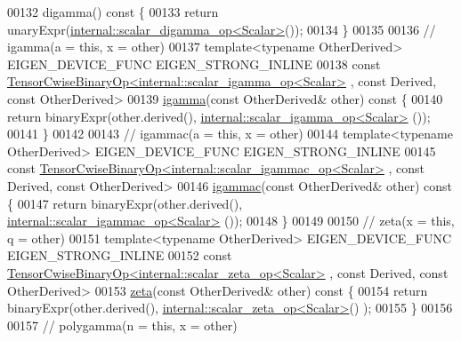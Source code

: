 \begin{DoxyCode}
00132     digamma()\textcolor{keyword}{ const }\{
00133       \textcolor{keywordflow}{return} unaryExpr(\hyperlink{struct_eigen_1_1internal_1_1scalar__digamma__op}{internal::scalar\_digamma\_op<Scalar>}());
00134     \}
00135 
00136     \textcolor{comment}{// igamma(a = this, x = other)}
00137     \textcolor{keyword}{template}<\textcolor{keyword}{typename} OtherDerived> EIGEN\_DEVICE\_FUNC EIGEN\_STRONG\_INLINE
00138     \textcolor{keyword}{const} \hyperlink{class_eigen_1_1_tensor_cwise_binary_op}{TensorCwiseBinaryOp<internal::scalar\_igamma\_op<Scalar>}
      , \textcolor{keyword}{const} Derived, \textcolor{keyword}{const} OtherDerived>
00139     \hyperlink{namespace_eigen_af5aa651137636b1cdbd27de1cfe91148}{igamma}(\textcolor{keyword}{const} OtherDerived& other)\textcolor{keyword}{ const }\{
00140       \textcolor{keywordflow}{return} binaryExpr(other.derived(), \hyperlink{struct_eigen_1_1internal_1_1scalar__igamma__op}{internal::scalar\_igamma\_op<Scalar>}
      ());
00141     \}
00142 
00143     \textcolor{comment}{// igammac(a = this, x = other)}
00144     \textcolor{keyword}{template}<\textcolor{keyword}{typename} OtherDerived> EIGEN\_DEVICE\_FUNC EIGEN\_STRONG\_INLINE
00145     \textcolor{keyword}{const} \hyperlink{class_eigen_1_1_tensor_cwise_binary_op}{TensorCwiseBinaryOp<internal::scalar\_igammac\_op<Scalar>}
      , \textcolor{keyword}{const} Derived, \textcolor{keyword}{const} OtherDerived>
00146     \hyperlink{namespace_eigen_a1abaa2ff8c7b1871eaf026a47c6bbf3b}{igammac}(\textcolor{keyword}{const} OtherDerived& other)\textcolor{keyword}{ const }\{
00147       \textcolor{keywordflow}{return} binaryExpr(other.derived(), \hyperlink{struct_eigen_1_1internal_1_1scalar__igammac__op}{internal::scalar\_igammac\_op<Scalar>}
      ());
00148     \}
00149 
00150     \textcolor{comment}{// zeta(x = this, q = other)}
00151     \textcolor{keyword}{template}<\textcolor{keyword}{typename} OtherDerived> EIGEN\_DEVICE\_FUNC EIGEN\_STRONG\_INLINE
00152     \textcolor{keyword}{const} \hyperlink{class_eigen_1_1_tensor_cwise_binary_op}{TensorCwiseBinaryOp<internal::scalar\_zeta\_op<Scalar>}
      , \textcolor{keyword}{const} Derived, \textcolor{keyword}{const} OtherDerived>
00153     \hyperlink{namespace_eigen_af9555e27540da78d2c4bdd17d3b750b1}{zeta}(\textcolor{keyword}{const} OtherDerived& other)\textcolor{keyword}{ const }\{
00154       \textcolor{keywordflow}{return} binaryExpr(other.derived(), \hyperlink{struct_eigen_1_1internal_1_1scalar__zeta__op}{internal::scalar\_zeta\_op<Scalar>}()
      );
00155     \}
00156 
00157     \textcolor{comment}{// polygamma(n = this, x = other)}

\end{DoxyCode}
